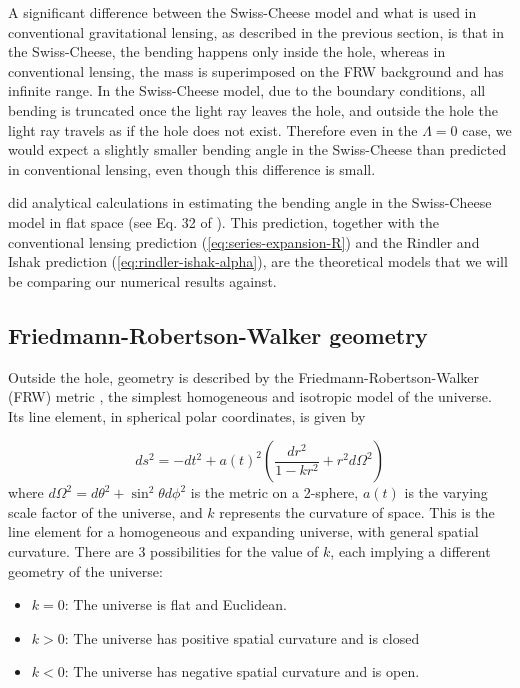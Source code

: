 A significant difference between the Swiss-Cheese model and what is used in conventional gravitational lensing, as described in the previous section, is that in the Swiss-Cheese, the bending happens only inside the hole, whereas in conventional lensing, the mass is superimposed on the FRW background and has infinite range. In the Swiss-Cheese model, due to the boundary conditions, all bending is truncated once the light ray leaves the hole, and outside the hole the light ray travels as if the hole does not exist. Therefore even in the $\Lambda = 0$ case, we would expect a slightly smaller bending angle in the Swiss-Cheese than predicted in conventional lensing, even though this difference is small. 

\citet{kantowski2010gravitational} did analytical calculations in estimating the bending angle in the Swiss-Cheese model in flat space (see Eq. 32 of \citet{kantowski2010gravitational}). This prediction, together with the conventional lensing prediction (\autoref{eq:series-expansion-R}) and the Rindler and Ishak prediction (\autoref{eq:rindler-ishak-alpha}), are the theoretical models that we will be comparing our numerical results against. 


\subsection{Friedmann-Robertson-Walker geometry}

Outside the hole, geometry is described by the Friedmann-Robertson-Walker (FRW) metric \cite{wald2010general}, the simplest homogeneous and isotropic model of the universe. Its line element, in spherical polar coordinates, is given by

\begin{equation}
  ds^2 = -dt^2 + a(t)^2 \left ( \frac{dr^2}{1-kr^2} + r^2 d \Omega^2 \right )
  \label{eq:frw-metric}
\end{equation}
where $d \Omega^2 = d\theta^2 + \sin^2\theta d\phi^2$ is the metric on a 2-sphere, $a(t)$ is the varying scale factor of the universe, and $k$ represents the curvature of space. This is the line element for a homogeneous and expanding universe, with general spatial curvature. There are 3 possibilities for the value of $k$, each implying a different geometry of the universe:

\begin{itemize}
  \item $k = 0$: The universe is flat and Euclidean.
  \item $k > 0$: The universe has positive spatial curvature and is closed
  \item $k < 0$: The universe has negative spatial curvature and is open. 
\end{itemize}

